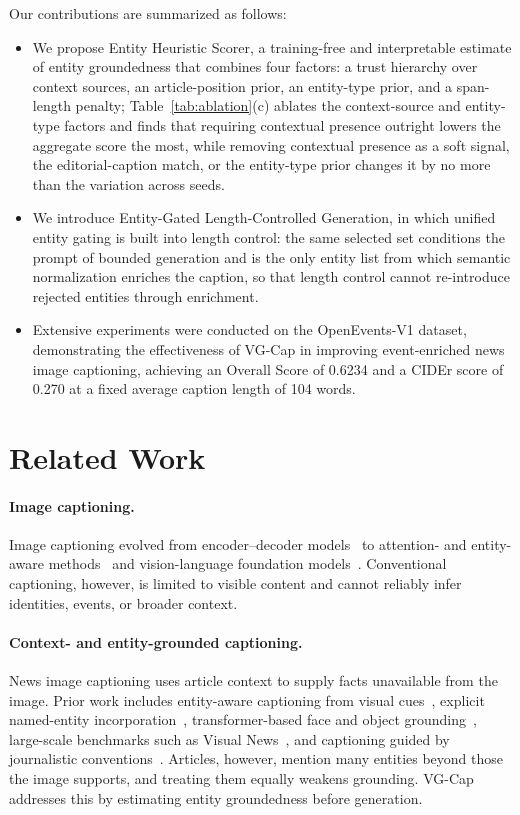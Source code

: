 \documentclass[runningheads]{llncs}
\DeclareRobustCommand{\aciids}[1]{{\color{olive}#1}}
\DeclareRobustCommand{\revise}[1]{{\color{olive}#1}}
\DeclareRobustCommand{\aciids}[1]{#1}
\DeclareRobustCommand{\revise}[1]{#1}
\begin{document}
Our contributions are summarized as follows:
\begin{itemize}
  \item \aciids{We propose Entity Heuristic Scorer, a training-free and interpretable estimate of entity groundedness that combines four factors: a trust hierarchy over context sources, an article-position prior, an entity-type prior, and a span-length penalty; Table~\ref{tab:ablation}(c) ablates the context-source and entity-type factors and finds that requiring contextual presence outright lowers the aggregate score the most, while removing contextual presence as a soft signal, the editorial-caption match, or the entity-type prior changes it by no more than the variation across seeds.}
  \item \aciids{We introduce Entity-Gated Length-Controlled Generation, in which unified entity gating is built into length control: the same selected set conditions the prompt of bounded generation and is the only entity list from which semantic normalization enriches the caption, so that length control cannot re-introduce rejected entities through enrichment.}
  \item \aciids{Extensive experiments were conducted on the OpenEvents-V1 dataset, demonstrating the effectiveness of VG-Cap in improving event-enriched news image captioning, achieving an Overall Score of 0.6234 and a CIDEr score of 0.270 at a fixed average caption length of 104 words.}
\end{itemize}

\section{Related Work}
\label{sec:related}

\paragraph{\textbf{Image captioning.}}
Image captioning evolved from encoder--decoder models~\cite{vinyals2015show} to attention- and entity-aware methods~\cite{you2016image,lu2018entity} and vision-language foundation models~\cite{chen2024internvl}. Conventional captioning, however, is limited to visible content and cannot reliably infer identities, events, or broader context.

\paragraph{\textbf{Context- and entity-grounded captioning.}}
News image captioning uses article context to supply facts unavailable from the image. Prior work includes entity-aware captioning from visual cues~\cite{biten2019good}, explicit named-entity incorporation~\cite{lu2018entity}, transformer-based face and object grounding~\cite{tran2020transform}, \revise{large-scale benchmarks such as Visual News~\cite{liu2021visualnews}, and captioning guided by journalistic conventions~\cite{yang2021journalistic}}. Articles, however, mention many entities beyond those the image supports, and treating them equally weakens grounding. VG-Cap addresses this by estimating entity groundedness before generation.
\end{document}
